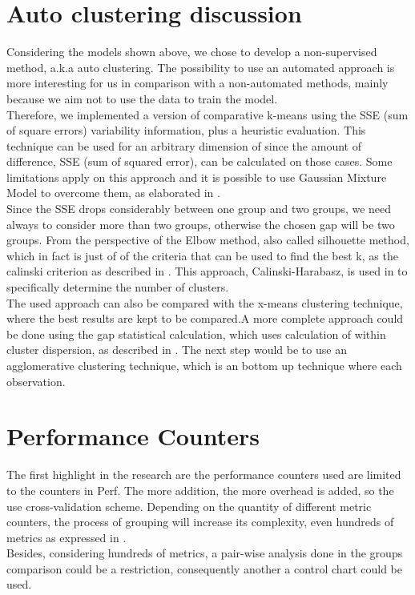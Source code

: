 \section{Auto clustering discussion}
Considering the models shown above, we chose to develop a non-supervised method, a.k.a auto clustering. The possibility to use an automated approach is more interesting for us in comparison with a non-automated methods, mainly because we aim not to use the data to train the model. \\
Therefore, we implemented a version of comparative k-means using the SSE (sum of square errors) variability information, plus a heuristic evaluation. This technique can be used for an arbitrary dimension of since the amount of difference, SSE (sum of squared error), can be calculated on those cases.  Some limitations apply on this approach and it is possible to use Gaussian Mixture Model to overcome them, as elaborated in \cite{gaussian}.\\
Since the SSE drops considerably between one group and two groups, we need always to consider more than two groups, otherwise the chosen gap will be two groups.
From the perspective of the Elbow method, also called silhouette method, which in fact is just of of the criteria that can be used to find the best k, as the calinski criterion as described in \cite{calinski}. This approach, Calinski-Harabasz,  is used in \cite{cluster} to specifically determine the number of clusters.\\
The used approach can also be compared with the x-means clustering technique, where the best results are kept to be compared.A more complete approach could be done using the gap statistical calculation, which uses calculation of within cluster dispersion, as described in \cite{gap_statistical}.
The next step would be to use an agglomerative clustering technique, which is an bottom up technique where each observation.

\section{Performance Counters}
The first highlight in the research are the performance counters used are limited to the counters in Perf. The more addition, the more overhead is added, so the use cross-validation scheme. 
Depending on the quantity of different metric counters, the process of grouping will increase its complexity, even hundreds of metrics as expressed in \cite{cluster}. \\
Besides, considering hundreds of metrics, a pair-wise analysis done in the groups comparison could be a restriction, consequently another a control chart could be used.
    
